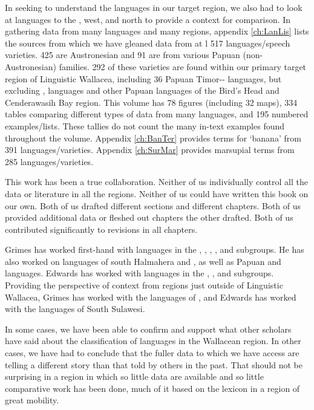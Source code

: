 In seeking to understand the languages in our target region,
we also had to look at languages to the , west,
and north to provide a context for comparison.
In gathering data from many languages and many regions,
appendix \ref{ch:LanLis} lists the sources from which we have gleaned
data from at l 517 languages/speech varieties.
425 are Austronesian and 91 are from various Papuan (non-Austronesian) families.
292 of these varieties are found within our primary
target region of Linguistic Wallacea,
including 36 Papuan Timor-- languages,
but excluding ,
 languages and other
Papuan languages of the Bird's Head and Cenderawasih Bay region.
This volume has 78 figures (including 32 maps),
334 tables comparing different types of data from many languages,
and 195 numbered examples/lists.
These tallies do not count the many in-text examples found throughout the volume.
Appendix \ref{ch:BanTer} provides terms for ‘banana’ from 391 languages/varieties.
Appendix \ref{ch:SurMar} provides marsupial terms from 285 languages/varieties.

This work has been a true collaboration.
Neither of us individually control all the data or literature in all the regions.
Neither of us could have written this book on our own.
Both of us drafted different sections and different chapters.
Both of us provided additional data or fleshed out chapters the other drafted.
Both of us contributed significantly to revisions in all chapters.

Grimes has worked first-hand with languages in the ,
, , , and  subgroups.
He has also worked on  languages of south Halmahera and ,
as well as Papuan  and  languages.
Edwards has worked with languages in the ,
, and  subgroups.
Providing the perspective of context from regions just outside of Linguistic Wallacea,
Grimes has worked with the languages of ,
and Edwards has worked with the   languages of South Sulawesi.

In some cases, we have been able to confirm and support what other scholars
have said about the classification of languages in the Wallacean region.
In other cases, we have had to conclude that the fuller data to which
we have access are telling a different story than that told by others in the past.
That should not be surprising in a region in which so
little data are available and so little comparative work has been done,
much of it based on the lexicon in a region of great mobility.

